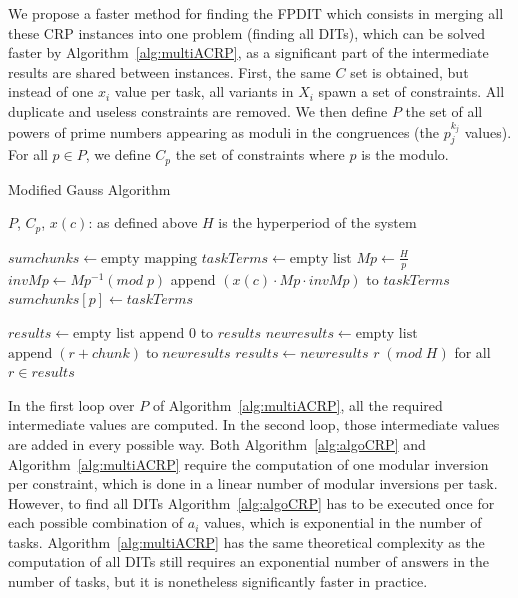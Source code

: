 \documentclass[conference]{IEEEtran}
\begin{document}
		We propose a faster method for finding the FPDIT which consists
		in merging all these CRP instances into one problem (finding all DITs), which can be solved faster by
		Algorithm~\ref{alg:multiACRP}, as a significant part of the intermediate
		results are shared between instances. First, the same $C$ set is obtained,
		but instead of one $x_i$ value per task, all variants in $X_i$ spawn a set of
		constraints. All duplicate and useless constraints are removed. We then
		define $P$ the set of all powers of prime numbers appearing as moduli in the
		congruences (the $p_j^{k_j}$ values). For all $p \in P$, we define $C_p$ the set of
		constraints where $p$ is the modulo.

		\begin{algorithm}
			\caption{Modified Gauss Algorithm}
			\label{alg:multiACRP}
			\begin{algorithmic}[1]
                \REQUIRE $P$, $C_{p}$, $x(c)$: as defined above
				\REQUIRE $H$ is the hyperperiod of the system

				\STATE $sumchunks \leftarrow \text{empty mapping}$
					\STATE $taskTerms \leftarrow \text{empty list}$
					\STATE $Mp \leftarrow \frac{H}{p}$
					\STATE $invMp \leftarrow Mp^{-1} (mod \; p)$
						\STATE append $(x(c) \cdot Mp \cdot invMp)$ to $taskTerms$
					\ENDFOR
					\STATE $sumchunks[p] \leftarrow taskTerms$
				\ENDFOR

				\STATE $results \leftarrow \text{empty list}$
				\STATE append $0$ to $results$
					\STATE $newresults \leftarrow \text{empty list}$
							\STATE $\text{append} \; (r + chunk) \; \text{to} \; newresults$
						\ENDFOR
					\ENDFOR
					\STATE $results \leftarrow newresults$
				\ENDFOR
				\RETURN $r \; (mod \; H)$ for all $r \in results$
			\end{algorithmic}
		\end{algorithm}
		In the first loop over $P$ of Algorithm~\ref{alg:multiACRP}, all the
		required intermediate values are computed. In the second loop, those
		intermediate values are added in every possible way. Both
		Algorithm~\ref{alg:algoCRP} and Algorithm~\ref{alg:multiACRP} require the
		computation of one modular inversion per constraint, which
		is done in a linear number of modular inversions per task. However, to
		find all DITs Algorithm~\ref{alg:algoCRP} has to be executed once for each possible
		combination of $a_i$ values, which is exponential in the number of tasks.
		Algorithm~\ref{alg:multiACRP} has the same theoretical complexity as the
		computation of all DITs still requires an exponential number of answers in the
		number of tasks, but it is nonetheless significantly faster in practice.
\end{document}
